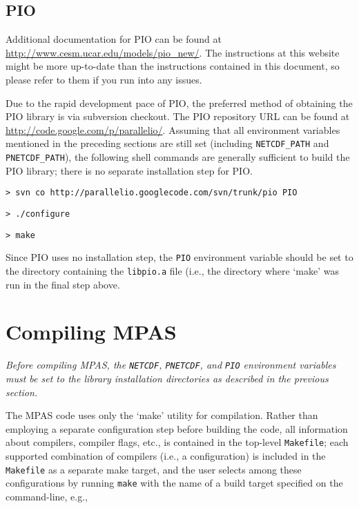 \subsection{PIO}

Additional documentation for PIO can be found at
\url{http://www.cesm.ucar.edu/models/pio_new/}. The instructions at this
website might be more up-to-date than the instructions contained in this
document, so please refer to them if you run into any issues.

Due to the rapid development pace of PIO, the preferred method of obtaining the PIO library is via subversion checkout. The PIO repository URL
can be found at \url{http://code.google.com/p/parallelio/}.
Assuming that all environment variables mentioned in the preceding sections are
still set (including {\tt NETCDF\_PATH} and {\tt PNETCDF\_PATH}), the following
shell commands are generally sufficient to build the PIO library; there is no
separate installation step for PIO.

\vspace{12pt}
{\tt > svn co http://parallelio.googlecode.com/svn/trunk/pio PIO}

{\tt > ./configure}

{\tt > make} 
\vspace{12pt}

Since PIO uses no installation step, the {\tt PIO} environment variable should be set to the directory containing the {\tt libpio.a} file (i.e., the directory where `make' was run in the final step above.


\section{Compiling MPAS}

{\em Before compiling MPAS, the {\tt NETCDF}, {\tt PNETCDF}, and {\tt PIO} environment variables must be set to the library installation directories as
described in the previous section.}

The MPAS code uses only the `make' utility for compilation. Rather than employing a separate configuration step
before building the code, all information about compilers, compiler flags, etc., is contained in the top-level {\tt Makefile}; each
supported combination of compilers (i.e., a configuration) is included in the {\tt Makefile} as a separate make target, and the user selects among
these configurations by running {\tt make} with the name of a build target specified on the command-line, e.g.,

